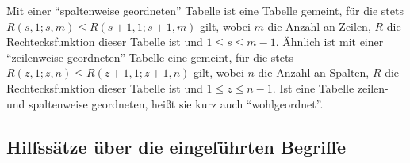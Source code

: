 \begin{definition}
    Mit einer "`spaltenweise geordneten"' Tabelle ist eine Tabelle gemeint, für die stets $R(s, 1; s, m)\leq 
    R(s+1, 1; s+1, m)$ gilt, wobei $m$ die Anzahl an Zeilen, $R$ die Rechtecksfunktion dieser Tabelle ist und 
    $1\leq s\leq m-1$. Ähnlich ist mit einer "`zeilenweise geordneten"' Tabelle eine gemeint, für die stets 
    $R(z, 1; z, n)\leq R(z+1, 1; z+1, n)$ gilt, wobei $n$ die Anzahl an Spalten, $R$ die Rechtecksfunktion dieser 
    Tabelle ist und $1\leq z\leq n-1$. Ist eine Tabelle zeilen- und spaltenweise geordneten, heißt sie kurz auch 
    "`wohlgeordnet"'.
\end{definition}

\subsection*{Hilfssätze über die eingeführten Begriffe}

\renewcommand{\qedsymbol}{$\square$}

